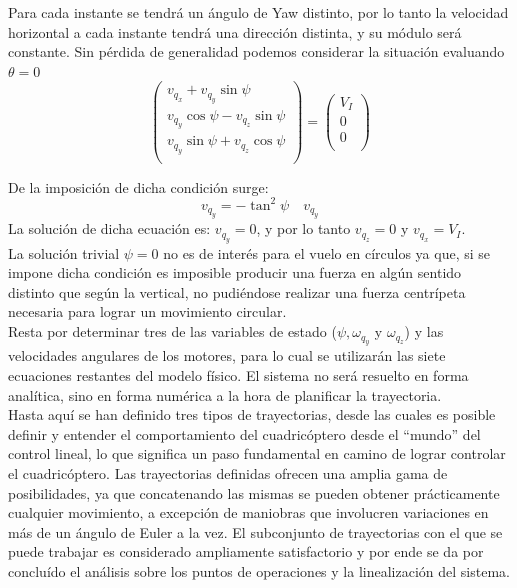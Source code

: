 \documentclass[main]{subfiles}
\begin{document}
Para cada instante se tendr\'a un \'angulo de Yaw distinto, por lo tanto la velocidad horizontal a cada instante tendr\'a una direcci\'on distinta, y su m\'odulo ser\'a constante. Sin p\'erdida de generalidad podemos considerar la situaci\'on evaluando $\theta = 0$
\begin{equation}
\label{eq:vel_theta}
\left(\begin{array}{c}
v_{q_x}+v_{q_y}\sin\psi\\
v_{q_y}\cos\psi-v_{q_z}\sin\psi\\
v_{q_y}\sin\psi+v_{q_z}\cos\psi\\
\end{array}\right)=\left(\begin{array}{c}
V_{I}\\
0\\
0\\
\end{array}\right)
\end{equation}	

De la imposici\'on de dicha condici\'on surge:
\begin{equation}
v_{q_y} = - \tan^2\psi \quad v_{q_y}
\end{equation}
La soluci\'on de dicha ecuaci\'on es: $v_{q_y} = 0$, y por lo tanto $v_{q_z} = 0$ y $v_{q_x} = V_I$.\\

La soluci\'on trivial $\psi=0$ no es de inter\'es para el vuelo en c\'irculos ya que, si se impone dicha condici\'on es imposible producir una fuerza en alg\'un sentido distinto que seg\'un la vertical, no pudi\'endose realizar una fuerza centr\'ipeta necesaria para lograr un movimiento circular.\\

Resta por determinar tres de las variables de estado ($\psi, \omega_{q_y}$ y $\omega_{q_z}$) y las velocidades angulares de los motores, para lo cual se utilizar\'an las siete ecuaciones restantes del modelo f\'isico. El sistema no ser\'a resuelto en forma anal\'itica, sino en forma num\'erica a la hora de planificar la trayectoria.\\[20pt]

Hasta aqu\'i se han definido tres tipos de trayectorias, desde las cuales es posible definir y entender el comportamiento del cuadric\'optero desde el ``mundo'' del control lineal, lo que significa un paso fundamental en camino de lograr controlar el cuadric\'optero. Las trayectorias definidas ofrecen una amplia gama de posibilidades, ya que concatenando las mismas se pueden obtener pr\'acticamente cualquier movimiento, a excepci\'on de maniobras que involucren variaciones en m\'as de un \'angulo de Euler a la vez. El subconjunto de trayectorias con el que se puede trabajar es considerado ampliamente satisfactorio y por ende se da por conclu\'ido el an\'alisis sobre los puntos de operaciones y la linealizaci\'on del sistema. 
\end{document}
